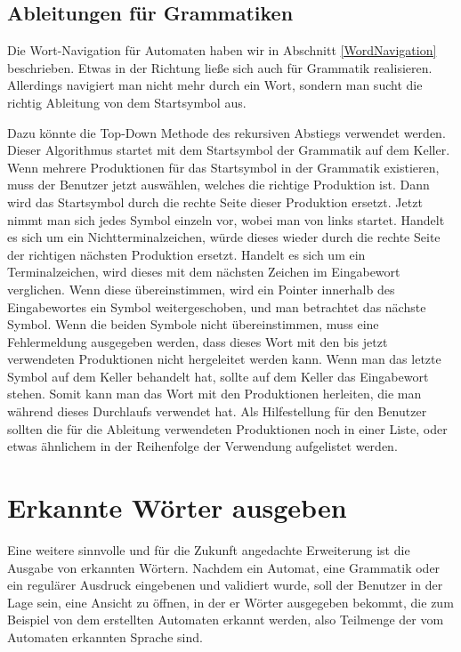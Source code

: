 \subsection{Ableitungen für Grammatiken}\label{PerspectiveGrammarWordNavigation}

Die Wort-Navigation für Automaten haben wir in Abschnitt
\ref{WordNavigation} beschrieben. Etwas in der Richtung ließe sich
auch für Grammatik realisieren. Allerdings navigiert man nicht mehr
durch ein Wort, sondern man sucht die richtig Ableitung von dem
Startsymbol aus.\vspace{10pt}

Dazu könnte die Top-Down Methode des rekursiven Abstiegs verwendet werden. Dieser
Algorithmus startet mit dem Startsymbol der Grammatik auf dem Keller. Wenn
mehrere Produktionen für das Startsymbol in der Grammatik existieren, muss der
Benutzer jetzt auswählen, welches die richtige Produktion ist. Dann wird das
Startsymbol durch die rechte Seite dieser Produktion ersetzt. Jetzt nimmt man
sich jedes Symbol einzeln vor, wobei man von links startet. Handelt es sich um
ein Nichtterminalzeichen, würde dieses wieder durch die rechte Seite der
richtigen nächsten Produktion ersetzt. Handelt es sich um ein Terminalzeichen,
wird dieses mit dem nächsten Zeichen im Eingabewort verglichen. Wenn diese
übereinstimmen, wird ein Pointer innerhalb des Eingabewortes ein Symbol
weitergeschoben, und man betrachtet das nächste Symbol. Wenn die beiden Symbole
nicht übereinstimmen, muss eine Fehlermeldung ausgegeben werden, dass dieses Wort
mit den bis jetzt verwendeten Produktionen nicht hergeleitet werden kann. Wenn
man das letzte Symbol auf dem Keller behandelt hat, sollte auf dem Keller das
Eingabewort stehen. Somit kann man das Wort mit den Produktionen herleiten, die
man während dieses Durchlaufs verwendet hat. Als Hilfestellung für den Benutzer
sollten die für die Ableitung verwendeten Produktionen noch in einer Liste, oder
etwas ähnlichem in der Reihenfolge der Verwendung aufgelistet
werden.\vspace{10pt}

\section{Erkannte Wörter ausgeben}\label{PerspectiveDetectedWords}

Eine weitere sinnvolle und für die Zukunft angedachte Erweiterung ist die Ausgabe
von erkannten Wörtern. Nachdem ein Automat, eine Grammatik oder ein regulärer
Ausdruck eingebenen und validiert wurde, soll der Benutzer in der Lage sein, eine
Ansicht zu öffnen, in der er Wörter ausgegeben bekommt, die zum Beispiel von dem
erstellten Automaten erkannt werden, also Teilmenge der vom Automaten erkannten
Sprache sind.\vspace{10pt}

